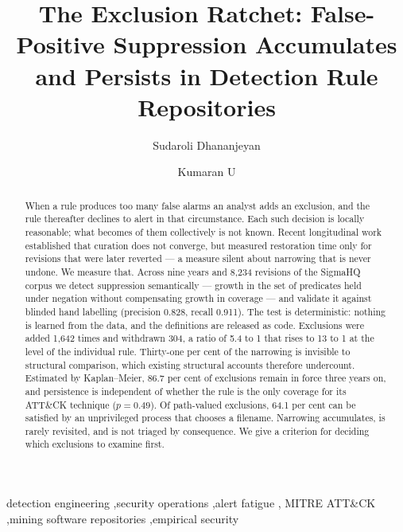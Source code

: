 \documentclass[preprint,12pt]{elsarticle}
\begin{document}
\begin{frontmatter}

\title{The Exclusion Ratchet: False-Positive Suppression Accumulates and
       Persists in Detection Rule Repositories}

\author[ind]{Sudaroli Dhananjeyan}

\author[amrita]{Kumaran U}



\begin{abstract}
When a rule produces too many false alarms an analyst adds an exclusion, and
the rule thereafter declines to alert in that circumstance. Each such
decision is locally reasonable; what becomes of them collectively is not
known. Recent longitudinal work established that curation does not converge,
but measured restoration time only for revisions that were later reverted
--- a measure silent about narrowing that is never undone. We measure that.
Across nine years and 8,234 revisions of the SigmaHQ corpus we detect
suppression semantically --- growth in the set of predicates held under
negation without compensating growth in coverage --- and validate it against
blinded hand labelling (precision 0.828, recall 0.911). The test is
deterministic: nothing is learned from the data, and the definitions are
released as code. Exclusions were added 1,642 times and withdrawn 304, a
ratio of 5.4 to 1 that rises to 13 to 1 at the level of the individual rule.
Thirty-one per cent of the narrowing is invisible to structural comparison,
which existing structural accounts therefore undercount. Estimated by
Kaplan--Meier, 86.7 per cent of exclusions remain in force three years on,
and persistence is independent of whether the rule is the only coverage for
its ATT\&CK technique ($p = 0.49$). Of path-valued exclusions, 64.1 per cent
can be satisfied by an unprivileged process that chooses a filename.
Narrowing accumulates, is rarely revisited, and is not triaged by
consequence. We give a criterion for deciding which exclusions to examine
first.
\end{abstract}

\begin{keyword}
detection engineering \sep security operations \sep alert fatigue \sep
MITRE ATT\&CK \sep mining software repositories \sep empirical security
\end{keyword}

\end{frontmatter}





\end{document}
